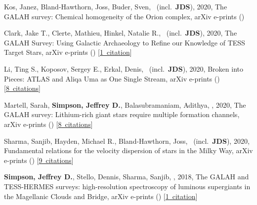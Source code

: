 \item[{\color{numcolor}\scriptsize6}] Kos, Janez, Bland-Hawthorn, Joss, Buder, Sven, \etal\ (incl.\ \textbf{JDS}), 2020, The GALAH survey: Chemical homogeneity of the Orion complex, arXiv e-prints ()

\item[{\color{numcolor}\scriptsize5}] Clark, Jake T., Clerte, Mathieu, Hinkel, Natalie R., \etal\ (incl.\ \textbf{JDS}), 2020, The GALAH Survey: Using Galactic Archaeology to Refine our Knowledge of TESS Target Stars, arXiv e-prints () [\href{https://ui.adsabs.harvard.edu/#abs/2020arXiv200805372C}{1~citation}]

\item[{\color{numcolor}\scriptsize4}] Li, Ting S., Koposov, Sergey E., Erkal, Denis, \etal\ (incl.\ \textbf{JDS}), 2020, Broken into Pieces: ATLAS and Aliqa Uma as One Single Stream, arXiv e-prints () [\href{https://ui.adsabs.harvard.edu/#abs/2020arXiv200610763L}{8~citations}]

\item[{\color{numcolor}\scriptsize3}] Martell, Sarah, \textbf{Simpson, Jeffrey D.}, Balasubramaniam, Adithya, \etal, 2020, The GALAH survey: Lithium-rich giant stars require multiple formation channels, arXiv e-prints () [\href{https://ui.adsabs.harvard.edu/#abs/2020arXiv200602106M}{8~citations}]

\item[{\color{numcolor}\scriptsize2}] Sharma, Sanjib, Hayden, Michael R., Bland-Hawthorn, Joss, \etal\ (incl.\ \textbf{JDS}), 2020, Fundamental relations for the velocity dispersion of stars in the Milky Way, arXiv e-prints () [\href{https://ui.adsabs.harvard.edu/#abs/2020arXiv200406556S}{9~citations}]

\item[{\color{numcolor}\scriptsize1}] \textbf{Simpson, Jeffrey D.}, Stello, Dennis, Sharma, Sanjib, \etal, 2018, The GALAH and TESS-HERMES surveys: high-resolution spectroscopy of luminous supergiants in the Magellanic Clouds and Bridge, arXiv e-prints () [\href{https://ui.adsabs.harvard.edu/#abs/2018arXiv180405900S}{1~citation}]